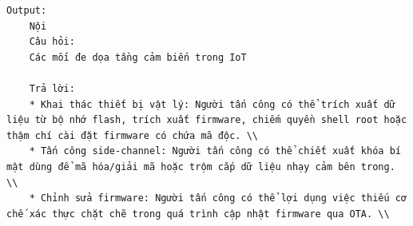 \documentclass[11pt]{article}
\begin{document}
\begin{verbatim}
Output:
	Nội
	Câu hỏi:
	Các mối đe dọa tầng cảm biến trong IoT

	Trả lời:
    * Khai thác thiết bị vật lý: Người tấn công có thể trích xuất dữ liệu từ bộ nhớ flash, trích xuất firmware, chiếm quyền shell root hoặc thậm chí cài đặt firmware có chứa mã độc. \\
    * Tấn công side-channel: Người tấn công có thể chiết xuất khóa bí mật dùng để mã hóa/giải mã hoặc trộm cắp dữ liệu nhạy cảm bên trong. \\
    * Chỉnh sửa firmware: Người tấn công có thể lợi dụng việc thiếu cơ chế xác thực chặt chẽ trong quá trình cập nhật firmware qua OTA. \\

\end{verbatim}
\end{document}

